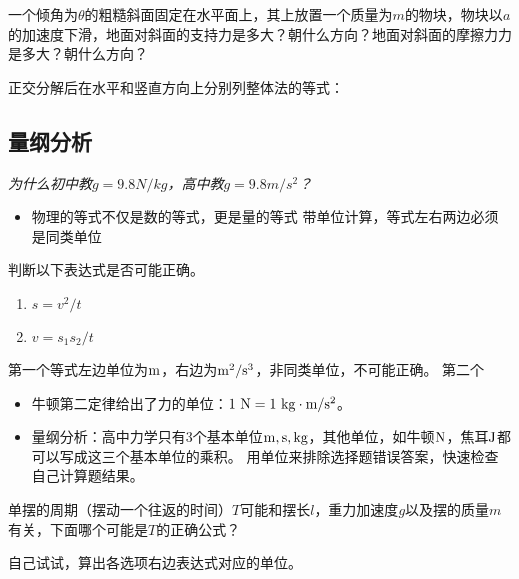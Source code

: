 \documentclass[a4paper,9pt]{ctexart}
\begin{document}
\begin{eg}
一个倾角为$\theta$的粗糙斜面固定在水平面上，其上放置一个质量为$m$的物块，物块以$a$的加速度下滑，地面对斜面的支持力是多大？朝什么方向？地面对斜面的摩擦力力是多大？朝什么方向？
\end{eg}
\begin{ans}
正交分解后在水平和竖直方向上分别列整体法的等式：
\vspace{6cm}
\end{ans}

\subsection{量纲分析}
\emph{为什么初中教$g = 9.8\unit{N/kg}$，高中教$g = 9.8\unit{m/s^2}$？}
\begin{itemize}
\item
物理的等式不仅是数的等式，更是量的等式 \so 带单位计算，等式左右两边必须是同类单位
\end{itemize}
\begin{eg}
判断以下表达式是否可能正确。
\begin{enumerate}
\item
$s = v^2/t$
\item
$v = s_1 s_2/t$
\end{enumerate}
\end{eg}
\begin{ans}
第一个等式左边单位为${\rm m}$，右边为${\rm m^2/s^3}$，非同类单位，不可能正确。
第二个
\end{ans}
\begin{itemize}
\item
牛顿第二定律给出了力的单位：$1 {\rm \ N} = 1{\rm \ kg\cdot m/s^2}$。
\item
量纲分析：高中力学只有3个基本单位${\rm m,s,kg}$，其他单位，如牛顿${\rm N}$，焦耳${\rm J}$都可以写成这三个基本单位的乘积。 \so 用单位来排除选择题错误答案，快速检查自己计算题结果。
\end{itemize}
\begin{eg}
单摆的周期（摆动一个往返的时间）$T$可能和摆长$l$，重力加速度$g$以及摆的质量$m$有关，下面哪个可能是$T$的正确公式？\\
\end{eg}
\begin{ans}
自己试试，算出各选项右边表达式对应的单位。
\vspace{5cm}
\end{ans}
\end{document}
